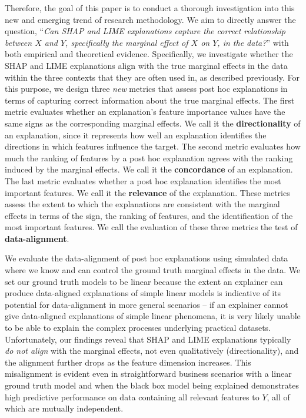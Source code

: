 \documentclass[12pt]{article}  %
\begin{document}
Therefore, the goal of this paper is to conduct a thorough investigation into this new and emerging trend of research methodology. We aim to directly answer the question, 
``\emph{Can SHAP and LIME explanations capture the correct relationship between $X$ and $Y$, specifically the marginal effect of $X$ on $Y$, in the data?}''
with both empirical and theoretical evidence.  Specifically, we investigate whether the SHAP and LIME explanations align with the true marginal effects in the data within the three contexts that they are often used in, as described previously. For this purpose, we design three \textit{new} metrics that assess post hoc explanations in terms of capturing correct information about the true marginal effects. The first metric evaluates whether an explanation's feature importance values have the same signs as the corresponding marginal effects. We call it the \textbf{directionality} of an explanation, since it represents how well an explanation identifies the directions in which features influence the target. The second metric evaluates how much the ranking of features by a post hoc explanation agrees with the ranking induced by the marginal effects. We call it the \textbf{concordance} of an explanation. The last metric evaluates whether a post hoc explanation identifies the most important features. We call it the \textbf{relevance} of the explanation. These metrics assess the extent to which the explanations are consistent with the marginal effects in terms of the sign, the ranking of features, and the identification of the most important features. We call the evaluation of these three metrics the test of \textbf{data-alignment}.

We evaluate the data-alignment of post hoc explanations using simulated data where we know and can control the ground truth marginal effects in the data. We set our ground truth models to be linear because the extent an explainer can produce data-aligned explanations of simple linear models is  indicative of its potential for data-alignment in more general scenarios -- if an explainer cannot give data-aligned explanations of simple linear phenomena, it is very likely unable to be able to explain the complex processes underlying practical datasets. Unfortunately, our findings reveal that SHAP and LIME explanations typically \textit{do not align} with the marginal effects, not even qualitatively (directionality), and the alignment further drops as the feature dimension increases. This misalignment is evident even in straightforward business scenarios with a linear ground truth model and when the black box model being explained demonstrates high predictive performance on data containing all relevant features to $Y$, all of which are mutually independent. 
\end{document}
